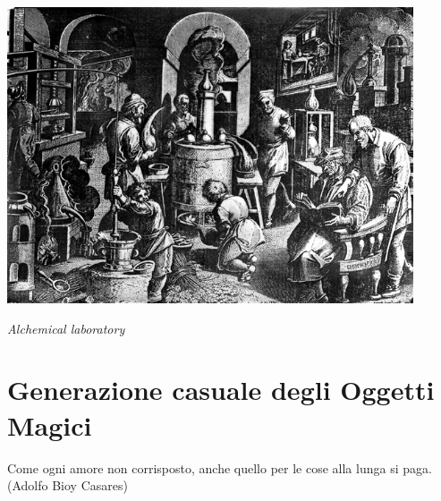 \vfill

\begin{center}
	\includegraphics[keepaspectratio,width=0.90\textwidth]{immagini/Alchemical_laboratory_Wellcome_M0005193.png}

	\textit{Alchemical laboratory}
\end{center}

\pagebreak


\section{Generazione casuale degli Oggetti Magici}\label{generazionetesorimagici}\hypertarget{generazionetesorimagici}{}

\begin{changemargin}{0.3cm}{0.3cm}\begin{enfasi}
		{Come ogni amore non corrisposto, anche quello per le cose alla lunga si paga. (Adolfo Bioy Casares)}
\end{enfasi}\end{changemargin}\medskip

